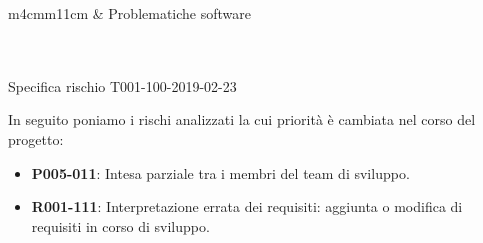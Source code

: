	\mydoublerule{\linewidth}{0pt}{2pt}
    
    \begin{table}[H]
		\begin{risktable}{\columnwidth}{m{4cm}m{11cm}}
			 &
			Problematiche software \\

			\rowcolor{\tablegray}
			\\

			\\
		\end{risktable}
		\caption{Specifica rischio T001-100-2019-02-23}		
	\end{table}
    
    \mydoublerule{\linewidth}{0pt}{2pt}
	\vspace{1cm}

	In seguito poniamo i rischi analizzati la cui priorità è cambiata nel corso del progetto:
	\begin{itemize}
	    \item \textbf{P005-011}: Intesa parziale tra i membri del team di sviluppo.
	    \item \textbf{R001-111}: Interpretazione errata dei requisiti: aggiunta o modifica di requisiti in corso di sviluppo.
	\end{itemize}